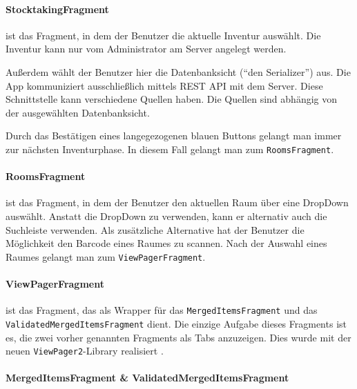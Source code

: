 \hypertarget{stocktakingfragment}{%
\paragraph{StocktakingFragment}\label{stocktakingfragment}}

ist das Fragment, in dem der Benutzer die aktuelle Inventur auswählt.
Die Inventur kann nur vom Administrator am Server angelegt werden.

Außerdem wählt der Benutzer hier die Datenbanksicht (``den Serializer'')
aus. Die App kommuniziert ausschließlich mittels REST API mit dem
Server. Diese Schnittstelle kann verschiedene Quellen haben. Die Quellen
sind abhängig von der ausgewählten Datenbanksicht.

Durch das Bestätigen eines langegezogenen blauen Buttons gelangt man
immer zur nächsten Inventurphase. In diesem Fall gelangt man zum
\texttt{RoomsFragment}.

\hypertarget{roomsfragment}{%
\paragraph{RoomsFragment}\label{roomsfragment}}

ist das Fragment, in dem der Benutzer den aktuellen Raum über eine
DropDown auswählt. Anstatt die DropDown zu verwenden, kann er alternativ
auch die Suchleiste verwenden. Als zusätzliche Alternative hat der
Benutzer die Möglichkeit den Barcode eines Raumes zu scannen. Nach der
Auswahl eines Raumes gelangt man zum \texttt{ViewPagerFragment}.

\hypertarget{viewpagerfragment}{%
\paragraph{ViewPagerFragment}\label{viewpagerfragment}}

ist das Fragment, das als Wrapper für das \texttt{MergedItemsFragment}
und das \texttt{ValidatedMergedItemsFragment} dient. Die einzige Aufgabe
dieses Fragments ist es, die zwei vorher genannten Fragments als Tabs
anzuzeigen. Dies wurde mit der neuen \texttt{ViewPager2}-Library
realisiert \cite{viewpager2}.

\hypertarget{mergeditemsfragment-validatedmergeditemsfragment}{%
\paragraph{MergedItemsFragment \&
ValidatedMergedItemsFragment}\label{mergeditemsfragment-validatedmergeditemsfragment}}

